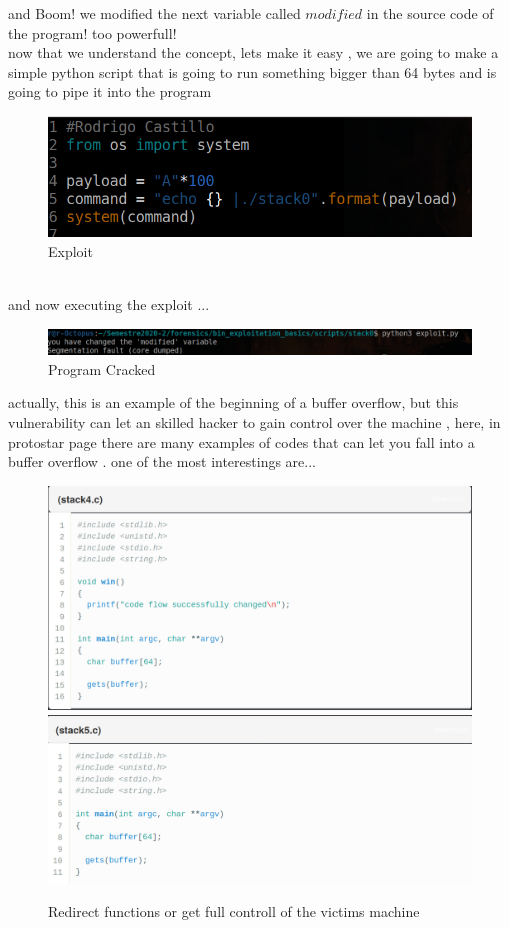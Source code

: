 \documentclass[10pt,a4paper]{article} %
\begin{document}
                and Boom! we modified the next variable called $ modified  $ in the
                source code of the program! too powerfull!
                \\ now that we understand the concept, lets make it easy , we are
                going to make a simple python script that is going to run something
                bigger than 64 bytes and is going to pipe it into the program
                \begin{figure}[h!]
                    \centering
                    \includegraphics[width=0.5\linewidth]{exploitpy.png}
                    \caption{Exploit}
                    \label{fig:exploitpy}
                \end{figure}

                \\ and now executing the exploit ...
                \begin{figure}[h!]
                    \centering
                    \includegraphics[width=0.5\linewidth]{booom.png}
                    \caption{Program Cracked}
                    \label{fig:boom}
                \end{figure}
                actually, this is an example of the beginning of a buffer overflow,
                but this vulnerability can let an skilled hacker to gain control
                over the machine , here, in protostar page there are many examples
                of codes that can let you fall into a buffer overflow . one of the most interestings are...
                \begin{figure}[h!]
                    \centering
                    \includegraphics[width=0.5\linewidth]{redirectfunctions.png}
                    \includegraphics[width=0.5\linewidth]{solo.png}
                    \caption{Redirect functions or get full controll of the victims machine}
                    \label{fig:redirectfunctions}
                \end{figure}
\end{document}
